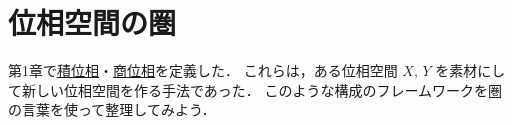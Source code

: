 \documentclass[geometry_main]{subfiles}
\begin{document}

	

\section{位相空間の圏}

第1章で\hyperref[def.prodtopo]{積位相}・\hyperref[def.quotopo]{商位相}を定義した．
これらは，ある位相空間 $X,\, Y$ を素材にして新しい位相空間を作る手法であった．
このような構成のフレームワークを圏の言葉を使って整理してみよう．
\end{document}
